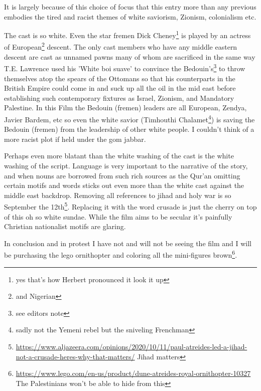 \documentclass{article}
\begin{document}
 It is largely because of this choice of focus that this entry more than any previous embodies the tired and racist themes of white saviorism, Zionism, colonialism etc.

The cast is so white. Even the star fremen Dick Cheney\footnote{yes that's how Herbert pronounced it look it up} is played by an actress of European\footnote{and Nigerian} descent. The only cast members who have any middle eastern descent are cast as unnamed pawns many of whom are sacrificed in the same way T.E. Lawrence used his 'White boi suave' to convince the Bedouin's\footnote{see editors note} to throw themselves atop the spears of the Ottomans so that his counterparts in the British Empire could come in and suck up all the oil in the mid east before establishing such contemporary fixtures as Israel, Zionism, and Mandatory Palestine. In this Film the Bedouin (fremen) leaders are all European, Zendya, Javier Bardem, etc so even the white savior (Timhouthi Chalamet\footnote{sadly not the Yemeni rebel but the sniveling Frenchman}) is saving the Bedouin (fremen) from the leadership of other white people. I couldn't think of a more racist plot if held under the gom jabbar.

Perhaps even more blatant than the white washing of the cast is the white washing of the script. Language is very important to the narrative of the story, and when nouns are borrowed from such rich sources as the Qur'an omitting certain motifs and words sticks out even more than the white cast against the middle east backdrop. Removing all references to jihad and holy war is so September the 12th\footnote{\href{https://www.aljazeera.com/opinions/2020/10/11/paul-atreides-led-a-jihad-not-a-crusade-heres-why-that-matters/}{https://www.aljazeera.com/opinions/2020/10/11/paul-atreides-led-a-jihad-not-a-crusade-heres-why-that-matters/} Jihad matters}. Replacing it with the word crusade is just the cherry on top of this oh so white sundae. While the film aims to be secular it's painfully Christian nationalist motifs are glaring.

In conclusion and in protest I have not and will not be seeing the film and I will be purchasing the lego ornithopter and coloring all the mini-figures brown\footnote{\href{https://www.lego.com/en-us/product/dune-atreides-royal-ornithopter-10327}{https://www.lego.com/en-us/product/dune-atreides-royal-ornithopter-10327} The Palestinians won't be able to hide from this}.

\hfill \break

\noindent{}
\end{document}
